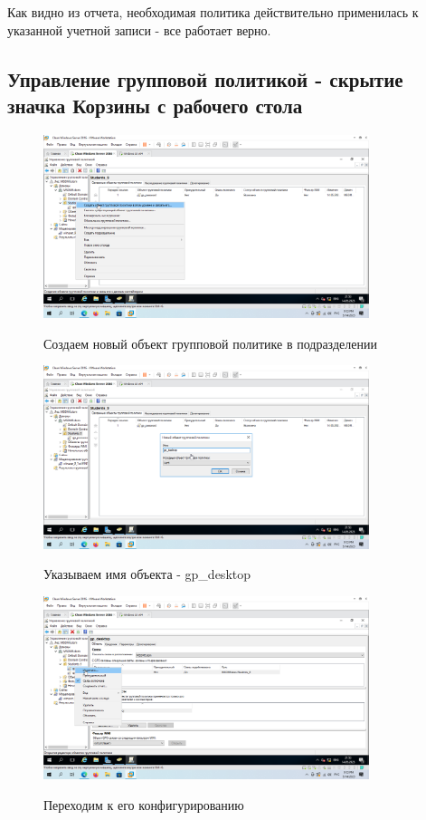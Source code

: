 \documentclass[a4paper]{article}
\begin{document}
  Как видно из отчета, необходимая политика действительно применилась к указанной учетной записи - все работает верно.

  \subsection{Управление групповой политикой - скрытие значка Корзины с рабочего стола}

  \begin{figure}[H]
    \centering
    \includegraphics[width=0.85\textwidth]{5_0136}
    \label{img:136}
    \caption{Создаем новый объект групповой политике в подразделении}
  \end{figure}

  \begin{figure}[H]
    \centering
    \includegraphics[width=0.85\textwidth]{5_0137}
    \label{img:137}
    \caption{Указываем имя объекта - gp_desktop}
  \end{figure}

  \begin{figure}[H]
    \centering
    \includegraphics[width=0.85\textwidth]{5_0138}
    \label{img:138}
    \caption{Переходим к его конфигурированию}
  \end{figure}
\end{document}

